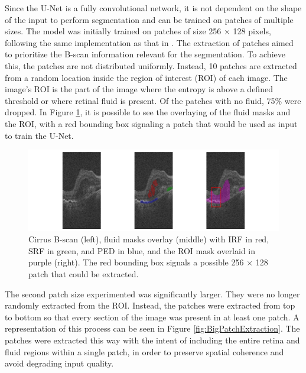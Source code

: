 Since the U-Net is a fully convolutional network, it is not dependent on the shape of the input to perform segmentation and can be trained on patches of multiple sizes. The model was initially trained on patches of size 256 $\times$ 128 pixels, following the same implementation as that in \textcite{Tennakoon2018}. The extraction of patches aimed to prioritize the B-scan information relevant for the segmentation. To achieve this, the patches are not distributed uniformly. Instead, 10 patches are extracted from a random location inside the region of interest (ROI) of each image. The image's ROI is the part of the image where the entropy is above a defined threshold or where retinal fluid is present. Of the patches with no fluid, 75\% were dropped. In Figure \ref{fig:FluidAndROI}, it is possible to see the overlaying of the fluid masks and the ROI, with a red bounding box signaling a patch that would be used as input to train the U-Net.

\begin{figure}[!ht]
	\centering
	\includegraphics[width=1.0\linewidth]{figures/FluidAndROI.png}
	\caption{Cirrus B-scan (left), fluid masks overlay (middle) with IRF in red, SRF in green, and PED in blue, and the ROI mask overlaid in purple (right). The red bounding box signals a possible 256 $\times$ 128 patch that could be extracted.}
	\label{fig:FluidAndROI}
\end{figure}

The second patch size experimented was significantly larger. They were no longer randomly extracted from the ROI. Instead, the patches were extracted from top to bottom so that every section of the image was present in at least one patch. A representation of this process can be seen in Figure \ref{fig:BigPatchExtraction}. The patches were extracted this way with the intent of including the entire retina and fluid regions within a single patch, in order to preserve spatial coherence and avoid degrading input quality.

